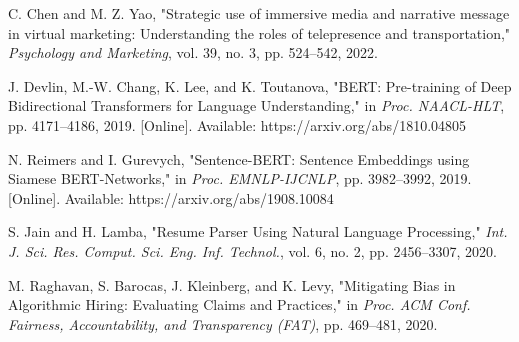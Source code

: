 \documentclass[a4paper]{article}
\begin{document}
\begin{multicols}{2}


\clearpage

\begin{thebibliography}{10}
     C. Chen and M. Z. Yao, "Strategic use of immersive media and narrative message in virtual marketing: Understanding the roles of telepresence and transportation," \textit{Psychology and Marketing}, vol. 39, no. 3, pp. 524–542, 2022.
    
     J. Devlin, M.-W. Chang, K. Lee, and K. Toutanova, "BERT: Pre-training of Deep Bidirectional Transformers for Language Understanding," in \textit{Proc. NAACL-HLT}, pp. 4171–4186, 2019. [Online]. Available: https://arxiv.org/abs/1810.04805
    
     N. Reimers and I. Gurevych, "Sentence-BERT: Sentence Embeddings using Siamese BERT-Networks," in \textit{Proc. EMNLP-IJCNLP}, pp. 3982–3992, 2019. [Online]. Available: https://arxiv.org/abs/1908.10084
    
     S. Jain and H. Lamba, "Resume Parser Using Natural Language Processing," \textit{Int. J. Sci. Res. Comput. Sci. Eng. Inf. Technol.}, vol. 6, no. 2, pp. 2456–3307, 2020.
    
     M. Raghavan, S. Barocas, J. Kleinberg, and K. Levy, "Mitigating Bias in Algorithmic Hiring: Evaluating Claims and Practices," in \textit{Proc. ACM Conf. Fairness, Accountability, and Transparency (FAT)}, pp. 469–481, 2020.
    

\end{thebibliography}
\end{multicols}
\end{document}
